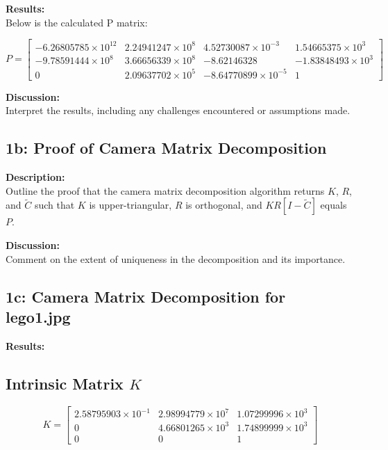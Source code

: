 \documentclass{article}
\begin{document}
\textbf{Results:} \\
Below is the calculated P matrix: 

\[
P = \begin{bmatrix}
-6.26805785 \times 10^{12} & 2.24941247 \times 10^{8} & 4.52730087 \times 10^{-3} & 1.54665375 \times 10^{3} \\
-9.78591444 \times 10^{8}  & 3.66656339 \times 10^{8} & -8.62146328 & -1.83848493 \times 10^{3} \\
0 & 2.09637702 \times 10^{5} & -8.64770899 \times 10^{-5} & 1 
\end{bmatrix}
\]

\textbf{Discussion:} \\
Interpret the results, including any challenges encountered or assumptions made.

\subsection{1b: Proof of Camera Matrix Decomposition}
\textbf{Description:} \\
Outline the proof that the camera matrix decomposition algorithm returns \(K\), \(R\), and \(\tilde{C}\) such that \(K\) is upper-triangular, \(R\) is orthogonal, and \(KR[I - \tilde{C}]\) equals \(P\).

\textbf{Discussion:} \\
Comment on the extent of uniqueness in the decomposition and its importance.

\subsection{1c: Camera Matrix Decomposition for lego1.jpg}
\textbf{Results:} \\
\subsection*{Intrinsic Matrix \(K\)}
\[
K = 
\begin{bmatrix}
2.58795903 \times 10^{-1} & 2.98994779 \times 10^{7} & 1.07299996 \times 10^{3} \\
0 & 4.66801265 \times 10^{3} & 1.74899999 \times 10^{3} \\
0 & 0 & 1
\end{bmatrix}
\]
\end{document}
